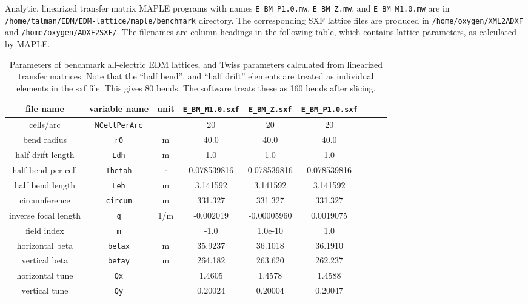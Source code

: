 \documentclass[12pt]{article}
\begin{document}
Analytic, linearized transfer matrix MAPLE programs with names {\tt E\_BM\_P1.0.mw}, 
{\tt E\_BM\_Z.mw}, and {\tt E\_BM\_M1.0.mw}
are in {\tt /home/talman/EDM/EDM-lattice/maple/benchmark} directory. The corresponding SXF 
lattice files are produced in {\tt /home/oxygen/XML2ADXF} and {\tt /home/oxygen/ADXF2SXF/}.
The filenames are column headings in the following table, which contains lattice parameters,
as calculated by MAPLE.
%
\begin{table}[h]
\caption{\label{tbl:benchmarkParams}Parameters of benchmark all-electric EDM lattices, 
and Twiss parameters calculated from linearized transfer matrices. Note that the 
``half bend'', and ``half drift'' elements are treated as individual elements in 
the sxf file. This gives 80 bends. The software treats these as 160 bends after slicing.
} 
\medskip
\centering
\begin{tabular}{|c|c|c|c|c|c|c|c|c|}           \hline
file name         & variable name     & unit & {\tt E\_BM\_M1.0.sxf} & {\tt E\_BM\_Z.sxf} & {\tt E\_BM\_P1.0.sxf} \\ \hline
cells/arc         & {\tt NCellPerArc} &      &      20               &       20           &        20             \\
bend radius       &  {\tt r0}         &  m   &     40.0              &      40.0          &       40.0            \\
half drift length &  {\tt Ldh}        &  m   &      1.0              &     1.0            &        1.0            \\
half bend per cell & {\tt Thetah}     &  r   &   0.078539816         &  0.078539816       &  0.078539816          \\
half bend length  & {\tt Leh}         &  m   &    3.141592           &  3.141592          &   3.141592            \\
circumference     & {\tt circum}      &  m   &   331.327             &   331.327          &    331.327            \\ \hline
inverse focal length &  {\tt q}       & 1/m  &    -0.002019          & -0.00005960        &     0.0019075         \\
field index       &  {\tt m}          &      &     -1.0              &  1.0e-10           &         1.0            \\ \hline
horizontal beta  & {\tt betax}       &  m   &    35.9237            &  36.1018           &     36.1910            \\
vertical beta     & {\tt betay}       &  m   &   264.182             &  263.620           &     262.237            \\ \hline
horizontal tune  &  {\tt Qx}         &      &     1.4605            &   1.4578           &      1.4588            \\
vertical tune     &  {\tt Qy}         &      &     0.20024           &   0.20004          &     0.20047            \\
\hline
\end{tabular}
\end{table}
%
\end{document}
